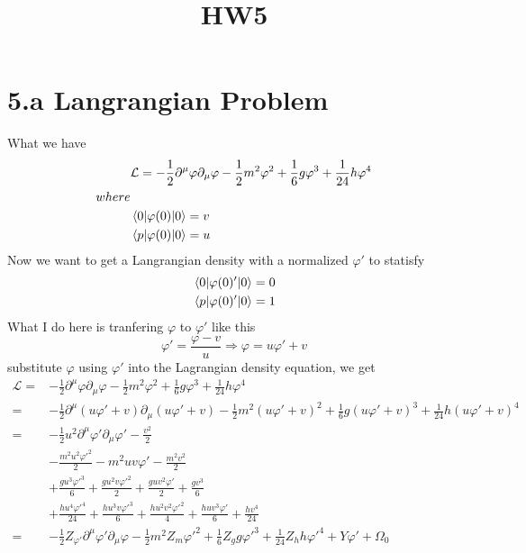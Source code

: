 \documentclass[11pt,a4paper,sans]{moderncv}        %
\title{HW5}                               %
\begin{document}
\makecvtitle

\vspace{-1.2cm}
\section{5.a Langrangian Problem}
\large
What we have
\begin{equation*}
\begin{split}
	&\mathcal{L} = -\frac{1}{2}\partial^{\mu}\varphi\partial_{\mu}\varphi -\frac{1}{2}m^2\varphi^2 + \frac{1}{6}g\varphi^3 + \frac{1}{24}h\varphi^4
\\
	where
\\
	&  \expval{\varphi(0)}{0} = v
\\
	&  \matrixel{p}{\varphi(0)}{0} = u
\end{split}
\end{equation*}
Now we want to get a Langrangian density with a normalized $\varphi'$ to statisfy
\begin{equation*}
\begin{split}
	&  \expval{\varphi(0)'}{0} = 0
\\
	&  \matrixel{p}{\varphi(0)'}{0} = 1
\end{split}
\end{equation*}
What I do here is tranfering $\varphi$ to $\varphi'$ like this
\begin{equation*}
	\varphi' = \frac{\varphi - v}{u} \Longrightarrow \varphi = u\varphi' + v
\end{equation*}
substitute $\varphi$ using $\varphi'$ into the Lagrangian density equation, we get
\begin{equation*}
\begin{split}
	\mathcal{L} = & -\frac{1}{2}\partial^{\mu}\varphi\partial_{\mu}\varphi - \frac{1}{2}m^2{\varphi}^2 + \frac{1}{6}g{\varphi}^3 + \frac{1}{24}h{\varphi}^4
	\\
	= & -\frac{1}{2}\partial^{\mu}(u\varphi' + v)\partial_{\mu}(u\varphi' + v) - \frac{1}{2}m^2(u\varphi' + v)^2 + \frac{1}{6}g(u\varphi' + v)^3 + \frac{1}{24}h(u\varphi' + v)^4
	\\
	= & -\frac{1}{2}{u^2}\partial^{\mu}\varphi'\partial_{\mu}\varphi' - \frac{v^2}{2}
	\\
	&  - \frac{m^2u^2{\varphi'}^2}{2} - {m^2uv\varphi'} - \frac{m^2v^2}{2}
	\\
	& + \frac{gu^3{\varphi'}^3}{6} + \frac{gu^2v{\varphi'}^2}{2} + \frac{guv^2\varphi'}{2} + \frac{gv^3}{6}
	\\
	& + \frac{hu^4{\varphi'}^4}{24} + \frac{hu^3v{\varphi'}^3}{6} + \frac{hu^2v^2{\varphi'}^2}{4} + \frac{huv^3\varphi'}{6} + \frac{hv^4}{24}
	\\
	= & -\frac{1}{2}Z_{\varphi'}\partial^{\mu}\varphi'\partial_{\mu}\varphi -\frac{1}{2}m^2Z_{m}{\varphi'}^2 + \frac{1}{6}Z_{g}g{\varphi'}^3 + \frac{1}{24}Z_{h}h{\varphi'}^4 + Y\varphi' + \Omega_{0}
\end{split}
\end{equation*}
\end{document}
